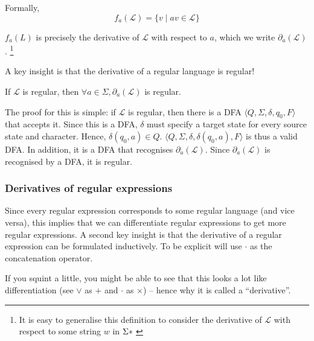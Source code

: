 Formally, \[f_a(\mathcal{L}) = \{ v \mid av \in \mathcal{L}\}\]

$f_a(L)$ is precisely the derivative of $\mathcal{L}$ with respect to $a$, which we write $\partial_a(\mathcal{L})$. \footnote{It is easy to generalise this definition to consider the derivative of $\mathcal{L}$ with respect to some string $w$ in $\Sigma\*$}

A key insight is that the derivative of a regular language is regular!

\begin{theorem}
    \label{thm:closure-differentiation}
    If $\mathcal{L}$ is regular, then $\forall a \in \Sigma, \partial_a(\mathcal{L})$ is regular.
\end{theorem}

The proof for this is simple: if $\mathcal{L}$ is regular, then there is a DFA $\langle Q, \Sigma, \delta, q_0, F \rangle$ that accepts it. Since this is a DFA, $\delta$ must specify a target state for every source state and character. Hence, $\delta(q_0, a) \in Q$. $\langle Q, \Sigma, \delta, \delta(q_0, a), F \rangle$ is thus a valid DFA. In addition, it is a DFA that recognises $\partial_a(\mathcal{L})$. Since $\partial_a(\mathcal{L})$ is recognised by a DFA, it is regular.

\subsubsection{Derivatives of regular expressions}
Since every regular expression corresponds to some regular language (and vice versa), this implies that we can differentiate regular expressions to get more regular expressions. A second key insight is that the derivative of a regular expression can be formulated inductively. To be explicit will use $\cdot$ as the concatenation operator. 

If you squint a little, you might be able to see that this looks a lot like differentiation (see $\lor$ as $+$ and $\cdot$ as $\times$) -- hence why it is called a ``derivative''.

